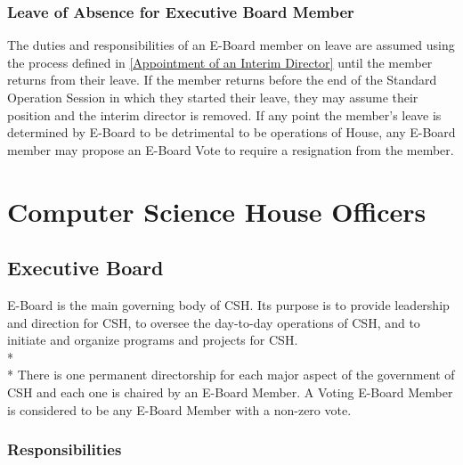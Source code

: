 \documentclass{article}
\newcommand{\article}[1]{\section{#1} \label{#1}}
\newcommand{\asection}[1]{\subsection{#1} \label{#1}}
\newcommand{\asubsection}[1]{\subsubsection{#1} \label{#1}}
\begin{document}
\asubsection{Leave of Absence for Executive Board Member}
The duties and responsibilities of an E-Board member on leave are assumed using the process defined in \ref{Appointment of an Interim Director} until the member returns from their leave.
If the member returns before the end of the Standard Operation Session in which they started their leave, they may assume their position and the interim director is removed. %
If any point the member's leave is determined by E-Board to be detrimental to be operations of House, any E-Board member may propose an E-Board Vote to require a resignation from the member.

\article{Computer Science House Officers}

\asection{Executive Board}
E-Board is the main governing body of CSH.
Its purpose is to provide leadership and direction for CSH, to oversee the day-to-day operations of CSH, and to initiate and organize programs and projects for CSH.
\\*\\*
There is one permanent directorship for each major aspect of the government of CSH and each one is chaired by an E-Board Member.
A Voting E-Board Member is considered to be any E-Board Member with a non-zero vote. %

\asubsection{Responsibilities}
\renewcommand{\theenumi}{\alph{enumi}} %
\end{document}
